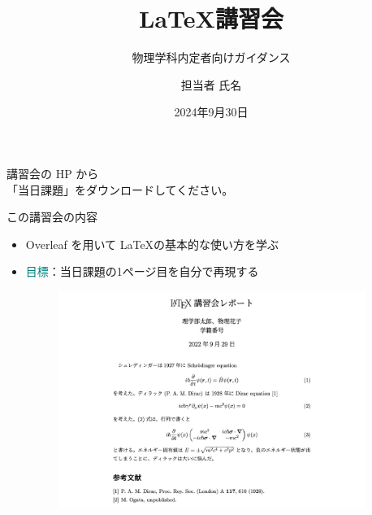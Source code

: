 \documentclass[dvipdfmx]{beamer}
\title{\LaTeX 講習会}
\author{担当者 氏名}
\date{2024年9月30日}
\subtitle{物理学科内定者向けガイダンス}
\begin{document}
\begin{frame}
\titlepage
\centering
\footnotesize{講習会の HP から\\「当日課題」をダウンロードしてください。}

\end{frame}

\begin{frame}{この講習会の内容}
\begin{itemize}
    \item Overleaf を用いて \LaTeX の基本的な使い方を学ぶ
    
    \bigskip
    \item \textcolor{teal}{目標}：当日課題の1ページ目を自分で再現する
    \begin{figure}
        \centering
        \includegraphics[width=10cm]{./figures/fig_kadai.pdf}
    \end{figure}
\end{itemize}
\end{frame}
\end{document}
